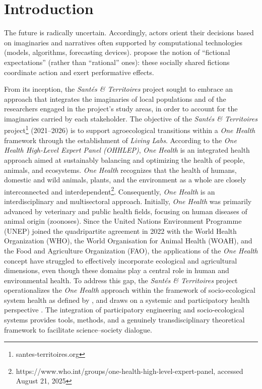 \documentclass{article}
\begin{document}
\section{Introduction}

The future is radically uncertain. Accordingly, actors orient their decisions based on imaginaries and narratives often supported by computational technologies (models, algorithms, forecasting devices). \textcite{beckert_uncertain_2018} propose the notion of “fictional expectations” (rather than “rational” ones): these socially shared fictions coordinate action and exert performative effects.  

From its inception, the \textit{\textit{Santés \& Territoires}} project sought to embrace an approach that integrates the imaginaries of local populations and of the researchers engaged in the project’s study areas, in order to account for the imaginaries carried by each stakeholder. The objective of the \textit{\textit{Santés \& Territoires}} project\footnote{santes-territoires.org} (2021–2026) is to support agroecological transitions within a \textit{One Health} framework through the establishment of \textit{Living Labs}. According to the \textit{One Health High-Level Expert Panel (OHHLEP)}, \textit{One Health} is an integrated health approach aimed at sustainably balancing and optimizing the health of people, animals, and ecosystems. \textit{One Health} recognizes that the health of humans, domestic and wild animals, plants, and the environment as a whole are closely interconnected and interdependent\footnote{https://www.who.int/groups/one-health-high-level-expert-panel, accessed August 21, 2025}. Consequently, \textit{One Health} is an interdisciplinary and multisectoral approach. Initially, \textit{One Health} was primarily advanced by veterinary and public health fields, focusing on human diseases of animal origin (zoonoses). Since the United Nations Environment Programme (UNEP) joined the quadripartite agreement in 2022 with the World Health Organization (WHO), the World Organisation for Animal Health (WOAH), and the Food and Agriculture Organization (FAO), the applications of the \textit{One Health} concept have struggled to effectively incorporate ecological and agricultural dimensions, even though these domains play a central role in human and environmental health. To address this gap, the \textit{\textit{Santés \& Territoires}} project operationalizes the \textit{One Health} approach within the framework of socio-ecological system health as defined by \textcite{de_garine-wichatitsky_health_2021}, and draws on a systemic and participatory health perspective \parencite{duboz_systems_2018}. The integration of participatory engineering and socio-ecological systems provides tools, methods, and a genuinely transdisciplinary theoretical framework to facilitate science–society dialogue.  
\end{document}
